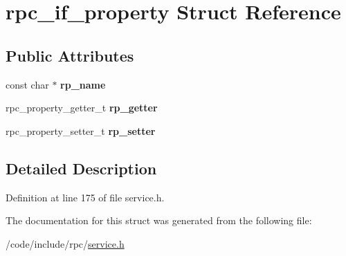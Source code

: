 \hypertarget{structrpc__if__property}{}\section{rpc\+\_\+if\+\_\+property Struct Reference}
\label{structrpc__if__property}
\subsection*{Public Attributes}
\begin{DoxyCompactItemize}
\item 
const char $\ast$ {\bfseries rp\+\_\+name}\hypertarget{structrpc__if__property_a5482e72e7b9df03cba9e3b86a4aa162c}{}\label{structrpc__if__property_a5482e72e7b9df03cba9e3b86a4aa162c}

\item 
rpc\+\_\+property\+\_\+getter\+\_\+t {\bfseries rp\+\_\+getter}\hypertarget{structrpc__if__property_a6b88200bb991311dae3c05e92dc16fdc}{}\label{structrpc__if__property_a6b88200bb991311dae3c05e92dc16fdc}

\item 
rpc\+\_\+property\+\_\+setter\+\_\+t {\bfseries rp\+\_\+setter}\hypertarget{structrpc__if__property_ab095fba7efd97b90f3440c2db5369f1e}{}\label{structrpc__if__property_ab095fba7efd97b90f3440c2db5369f1e}

\end{DoxyCompactItemize}


\subsection{Detailed Description}


Definition at line 175 of file service.\+h.



The documentation for this struct was generated from the following file\+:\begin{DoxyCompactItemize}
\item 
/code/include/rpc/\hyperlink{service_8h}{service.\+h}\end{DoxyCompactItemize}

